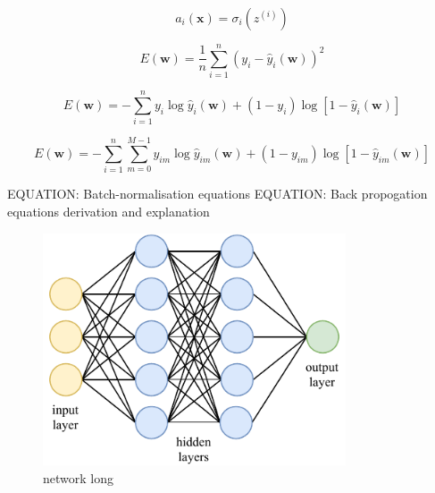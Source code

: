 \begin{equation} %
    a_{i}(\boldsymbol{x})=\sigma_i(z^{(i)})
\end{equation}

\begin{equation} %
    E(\boldsymbol{w})=
    \frac{1}{n}\displaystyle\sum_{i=1}^{n}(y_{i}-
    \hat{y}_{i}(\boldsymbol{w}))^{2}
\end{equation}

\begin{equation} %
    E(\boldsymbol{w})=
    -\displaystyle\sum_{i=1}^{n}y_{i}\log\hat{y}_{i}(\boldsymbol{w})+
    (1-y_{i})\log[1-\hat{y}_{i}(\boldsymbol{w})]
\end{equation}

\begin{equation} %
    E(\boldsymbol{w})=
    -\displaystyle\sum_{i=1}^{n}\displaystyle\sum_{m=0}^{M-1}y_{im}\log\hat{y}_{im}
    (\boldsymbol{w})+(1-y_{im})\log[1-\hat{y}_{im}(\boldsymbol{w})]
\end{equation}

EQUATION: Batch-normalisation equations
EQUATION: Back propogation equations derivation and explanation

\begin{figure} %
    \includegraphics[width=0.8\textwidth]{diagrams/7-cvn/network.pdf}
    \caption[network short]
    {network long}
    \label{fig:network}
\end{figure}

